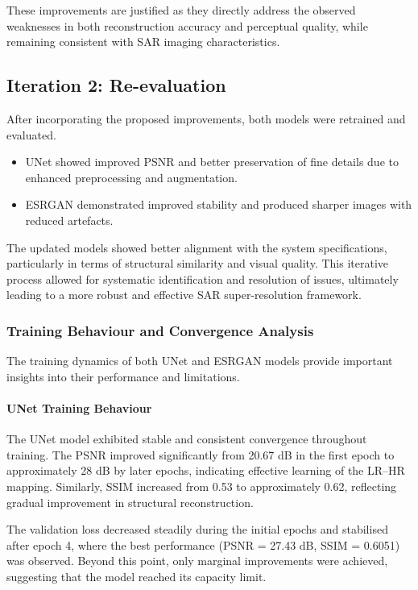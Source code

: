 \documentclass[conference]{IEEEtran}
\begin{document}
These improvements are justified as they directly address the observed weaknesses in both reconstruction accuracy and perceptual quality, while remaining consistent with SAR imaging characteristics.

\subsection{Iteration 2: Re-evaluation}

After incorporating the proposed improvements, both models were retrained and evaluated.

\begin{itemize}
    \item UNet showed improved PSNR and better preservation of fine details due to enhanced preprocessing and augmentation.
    \item ESRGAN demonstrated improved stability and produced sharper images with reduced artefacts.
\end{itemize}

The updated models showed better alignment with the system specifications, particularly in terms of structural similarity and visual quality.
This iterative process allowed for systematic identification and resolution of issues, ultimately leading to a more robust and effective SAR super-resolution framework.

\subsubsection{Training Behaviour and Convergence Analysis}

The training dynamics of both UNet and ESRGAN models provide important insights into their performance and limitations.

\paragraph{UNet Training Behaviour}

The UNet model exhibited stable and consistent convergence throughout training. The PSNR improved significantly from 20.67 dB in the first epoch to approximately 28 dB by later epochs, indicating effective learning of the LR–HR mapping. Similarly, SSIM increased from 0.53 to approximately 0.62, reflecting gradual improvement in structural reconstruction.

The validation loss decreased steadily during the initial epochs and stabilised after epoch 4, where the best performance (PSNR = 27.43 dB, SSIM = 0.6051) was observed. Beyond this point, only marginal improvements were achieved, suggesting that the model reached its capacity limit.
\end{document}
